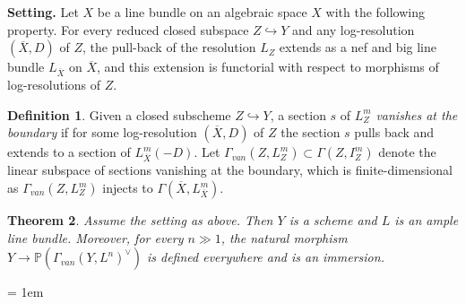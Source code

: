 \documentclass{amsart}
\newtheorem{theorem}{Theorem}[subsection]
\theoremstyle{definition}
\newtheorem{definition}[theorem]{Definition}
\numberwithin{equation}{section}
\begin{document}
{\bfseries\noindent Setting.}
Let $X$ be a line bundle on an algebraic space $X$ with the following property.
For every reduced closed subspace $Z \hookrightarrow Y$
and any log-resolution $(\overline{X},D)$ of $Z$,
the pull-back of the resolution $L_Z$ extends as a nef and big line bundle $L_{\overline{X}}$ on $\overline{X}$,
and this extension is functorial with respect to morphisms of log-resolutions of $Z$.

\begin{definition}
	Given a closed subscheme $Z \hookrightarrow Y$,
	a section $s$ of $L^m_Z$ \emph{vanishes at the boundary}
	if for some log-resolution $(\overline{X},D)$ of $Z$
	the section $s$ pulls back and extends to a section of $L^m_{\overline{X}}(-D)$.
	Let $\Gamma_{van}(Z,L^m_Z) \subset \Gamma(Z,I^m_Z)$ denote the linear subspace of sections vanishing at the boundary,
	which is finite-dimensional as $\Gamma_{van}(Z,L^m_Z)$ injects to $\Gamma(\overline{X},L^m_{\overline{X}})$.
\end{definition}

\begin{theorem}
	Assume the setting as above.
	Then $Y$ is a scheme and $L$ is an ample line bundle.
	Moreover, for every $n \gg 1$,
	the natural morphism $Y \to \mathbb{P}(\Gamma_{van}(Y,L^n)^{\vee})$ is defined everywhere and is an immersion.
\end{theorem}

\emergencystretch = 1em
\printbibliography
\end{document}
